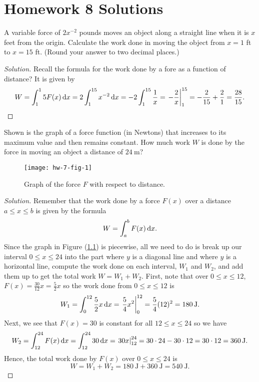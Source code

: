 \chapter{Homework 8 Solutions}
\begin{problem}[WebAssign, HW8, 1]
  A variable force of $2x^{-2}$ pounds moves an object along a straight
  line when it is $x$ feet from the origin. Calculate the work done in
  moving the object from $x=1$ ft to $x=15$ ft. (Round your answer to two
  decimal places.)
\end{problem}
\begin{proof}[Solution]
Recall the formula for the work done by a fore as a function of distance?
It is given by
\[
W=\int_1^15 F(x)\,\mathrm{d} x=
2\int_1^{15} x^{-2}\,\mathrm{d} x=
-2\int_1^{15}\frac{1}{x}
=\left.-\frac{2}{x}\right|_1^{15}=
-\frac{2}{15}+\frac{2}{1}=\frac{28}{15}.
\]
\end{proof}
\begin{problem}[WebAssign, HW8, 2]
Shown is the graph of a force function (in Newtons) that increases to its
maximum value and then remains constant. How much work $W$ is done by the
force in moving an object a distance of $\SI{24}{\meter}$?
\begin{figure}[htbp]
  \centering
  \texttt{[image: hw-7-fig-1]}
  \caption{Graph of the force $F$ with respect to distance.}
  \label{fig:hw-7-1}
\end{figure}
\end{problem}
\begin{proof}[Solution]
Remember that the work done by a force $F(x)$ over a distance
$a\leq x\leq b$ is given by the formula
\begin{equation}
  \label{eq:work}
W=\int_a^b F(x)\,\mathrm{d} x.
\end{equation}
Since the graph in Figure (\ref{fig:hw-7-1}) is piecewise, all we need to
do is break up our interval $0\leq x\leq 24$ into the part where $y$ is a
diagonal line and where $y$ is a horizontal line, compute the work done on
each interval, $W_1$ and $W_2$, and add them up to get the total work
$W=W_1+W_2$.  First, note that over $0\leq x\leq 12$,
$F(x)=\frac{30}{12}x=\frac{5}{2}x$ so the work done from $0\leq x\leq 12$
is
\[
W_1=\int_0^{12}\frac{5}{2}x\,\mathrm{d} x=
\left.\frac{5}{4}x^2\right|_0^{12}=
\frac{5}{4}(12)^2=\SI{180}{\joule}.
\]
Next, we see that $F(x)=30$ is constant for all $12\leq x\leq 24$
so we have
\[
W_2=\int_{12}^{24}F(x)\,\mathrm{d} x=
\int_{12}^{24}30\,\mathrm{d} x=
\left.30x\right|_{12}^{24}=
30\cdot 24-30\cdot 12=30\cdot 12=\SI{360}{\joule}.
\]
Hence, the total work done by $F(x)$ over $0\leq x\leq 24$ is
\[
  \boxed{W=W_1+W_2=\SI{180}{\joule}+\SI{360}{\joule}=\SI{540}{\joule}.}
\]
\end{proof}
